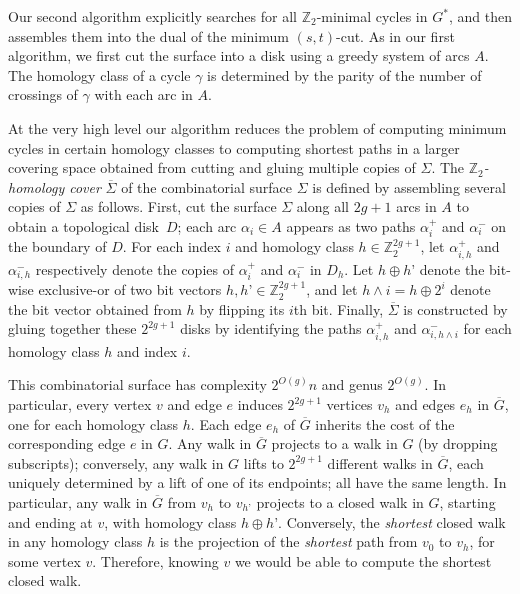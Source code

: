 \documentclass[natbib]{svcyclop}
\def\Z{\mathbb{Z}}
\begin{document}
Our second algorithm \cite{en-mcsnc-11} explicitly searches for all $\Z_2$-minimal cycles in $G^*$, and then assembles them into the dual of the minimum $(s,t)$-cut.
As in our first algorithm, we first cut the surface into a disk using a greedy system of arcs $A$.  The homology class of a cycle $\gamma$ is determined by the parity of the number of crossings of $\gamma$ with each arc in $A$.

At the very high level our algorithm reduces the problem of computing minimum cycles in certain homology classes to computing shortest paths in a larger covering space obtained from cutting and gluing multiple copies of $\Sigma$.
The \emph{$\Z_2$-homology cover} $\overline\Sigma$ of the combinatorial surface $\Sigma$ is defined by assembling several copies of $\Sigma$ as follows.  First, cut the surface $\Sigma$ along all $2g+1$ arcs in $A$ to obtain a topological disk~$D$; each arc $\alpha_i\in A$ appears as two paths $\alpha_i^+$ and $\alpha_i^-$ on the boundary of $D$.  For each index $i$ and homology class $h\in\Z_2^{2g+1}$, let $\alpha^+_{i,h}$ and $\alpha^-_{i,h}$ respectively denote the copies of $\alpha_i^+$ and $\alpha_i^-$ in $D_h$.  Let $h\oplus h’$ denote the bit-wise exclusive-or of two bit vectors $h, h’\in\Z_2^{2g+1}$, and let $h \land i = h\oplus 2^i$ denote the bit vector obtained from $h$ by flipping its $i$th bit.  Finally, $\overline\Sigma$ is constructed by gluing together these $2^{2g+1}$ disks by identifying the paths $\alpha^+_{i,h}$ and $\alpha^-_{i,h \land i}$ for each homology class $h$ and index $i$.  

This combinatorial surface has complexity $2^{O(g)}n$ and genus $2^{O(g)}$.  In particular, 
every vertex $v$ and edge $e$ induces $2^{2g+1}$ vertices $v_h$ and edges $e_h$ in $\overline{G}$, one for each homology class $h$.  Each edge $e_h$ of $\overline{G}$ inherits the cost of the corresponding edge $e$ in $G$.  
Any walk in $\overline{G}$ projects to a walk in $G$ (by dropping subscripts); conversely, any walk in $G$ lifts to $2^{2g+1}$ different walks in $\overline{G}$, each uniquely determined by a lift of one of its endpoints; all have the same length.  In particular, any walk in $\overline{G}$ from $v_h$ to $v_{h’}$ projects to a closed walk in $G$, starting and ending at $v$, with homology class $h\oplus h’$.  Conversely, the \emph{shortest} closed walk in any homology class $h$ is the projection of the \emph{shortest} path from $v_0$ to $v_h$, for some vertex $v$.  Therefore, knowing $v$ we would be able to compute the shortest closed walk.
\end{document}
